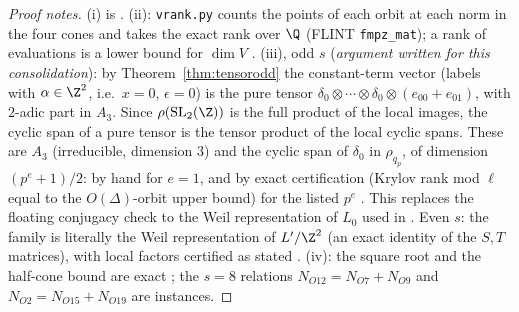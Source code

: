 \begin{proof}[Proof notes]
(i) is . (ii): \texttt{vrank.py} counts the points of each orbit at each norm in the four cones and takes the exact rank over $\Q$ (FLINT
\texttt{fmpz\_mat}); a rank of evaluations is a lower bound for $\dim V$ . (iii), odd $s$ (\emph{argument written for this consolidation}): by
Theorem~\ref{thm:tensorodd} the constant-term vector (labels with $\alpha\in\Z^2$, i.e.\ $x=0$, $\epsilon=0$) is the pure tensor
$\delta_0\otimes\cdots\otimes\delta_0\otimes(e_{00}+e_{01})$, with $2$-adic part in $A_3$. Since $\rho(\mathrm{SL}_2(\Z))$ is the full product of the local images,
the cyclic span of a pure tensor is the tensor product of the local cyclic spans. These are $A_3$ (irreducible, dimension $3$) and the cyclic span of $\delta_0$
in $\rho_{q_p}$, of dimension $(p^e+1)/2$: by hand for $e=1$, and by exact certification (Krylov rank mod $\ell$ equal to the $O(\Delta)$-orbit upper bound)
for the listed $p^e$ . This replaces the floating conjugacy check to the Weil representation of $L_0$ used in . Even $s$: the family is
literally the Weil representation of $L'/\Z^2$ (an exact identity of the $S,T$ matrices), with local factors certified as stated . (iv): the square root
and the half-cone bound are exact ; the $s=8$ relations $N_{O12}=N_{O7}+N_{O9}$ and $N_{O2}=N_{O15}+N_{O19}$ are instances.
\end{proof}


